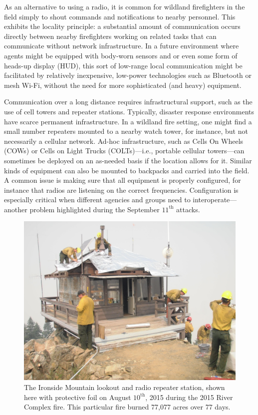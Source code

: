 \documentclass[]             %
{NASA}                       %
\theoremstyle{definition}
\begin{document}
As an alternative to using a radio, it is common for wildland
firefighters in the field simply to shout commands and notifications
to nearby personnel. This exhibits the locality principle: a
substantial amount of communication occurs directly between nearby
firefighters working on related tasks that can communicate without
network infrastructure. In a future environment where agents might be
equipped with body-worn sensors and or even some form of heads-up
display (HUD), this sort of low-range local communication might be
facilitated by relatively inexpensive, low-power technologies such as
Bluetooth or mesh Wi-Fi, without the need for more sophisticated (and
heavy) equipment.

Communication over a long distance requires infrastructural support,
such as the use of cell towers and repeater stations. Typically,
disaster response environments have scarce permanent infrastructure. In a wildland fire setting, one might find a small number repeaters mounted to a
nearby watch tower, for instance, but not necessarily a cellular network. Ad-hoc infrastructure, such as Cells On Wheels
(COWs) or Cells on Light Trucks (COLTs)---i.e., portable cellular
towers---can sometimes be deployed on an as-needed basis if the
location allows for it. Similar kinds of equipment can also be mounted
to backpacks and carried into the field. A common issue is making sure
that all equipment is properly configured, for instance that radios
are listening on the correct frequencies. Configuration is especially
critical when different agencies and groups need to
interoperate---another problem highlighted during the September
$11^\textrm{th}$ attacks.

\begin{figure}[t]
  \centering
  \includegraphics[scale=0.085]{images/ironside.jpg}
  \caption{The Ironside Mountain lookout and radio repeater station,
    shown here with protective foil on August $10^\textrm{th}$, 2015
    during the 2015 River Complex fire. This particular fire burned
    77,077 acres over 77 days.}
  \label{fig:ironside}
\end{figure}
\end{document}

